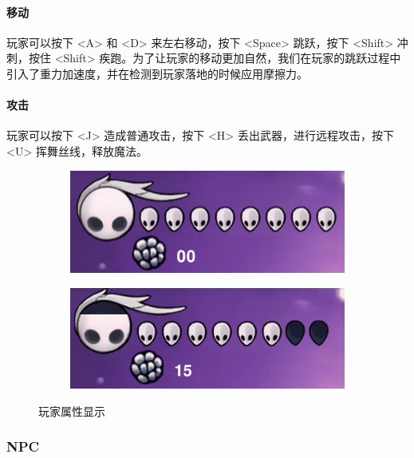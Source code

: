 \documentclass[12pt, twoside, a4paper]{article}
\begin{document}
\paragraph{移动} 玩家可以按下 <A> 和 <D> 来左右移动，按下 <Space> 跳跃，按下 <Shift> 冲刺，按住 <Shift> 疾跑。为了让玩家的移动更加自然，我们在玩家的跳跃过程中引入了重力加速度，并在检测到玩家落地的时候应用摩擦力。

\paragraph{攻击} 玩家可以按下 <J> 造成普通攻击，按下 <H> 丢出武器，进行远程攻击，按下 <U> 挥舞丝线，释放魔法。

\begin{figure}[h!]
    \centering
    \begin{subfigure}{0.4\textwidth}
        \includegraphics[width=\textwidth]{assets/report/health0.png}
    \end{subfigure}
    \hspace{0.05\textwidth}
    \begin{subfigure}{0.4\textwidth}
        \includegraphics[width=\textwidth]{assets/report/health1.png}
    \end{subfigure}
    \caption{玩家属性显示}
\end{figure}

\subsubsection{NPC}
\end{document}
